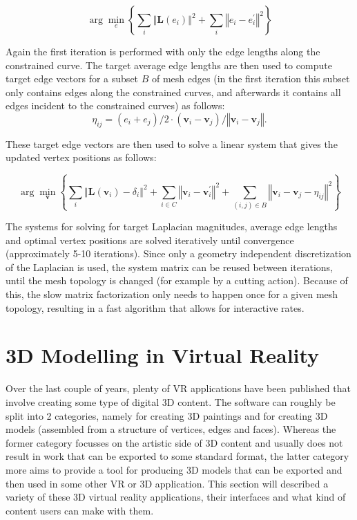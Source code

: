 \begin{equation}
\arg\min_{e} \left\lbrace \sum_{i} \left\Vert \mathbf{L}\left(e_{i}\right) \right\Vert^{2} + \sum_{i} \left\Vert e_{i} - e_{i}^{'} \right\Vert^{2} \right\rbrace
\end{equation}

Again the first iteration is performed with only the edge lengths along the constrained curve. 
The target average edge lengths are then used to compute target edge vectors for a subset $B$ of mesh edges (in the first iteration this subset only contains edges along the constrained curves, and afterwards it contains all edges incident to the constrained curves) as follows:
\begin{equation}
\eta_{ij} = \left( e_{i} + e_{j} \right) / 2 \cdot \left( \mathbf{v}_{i} - \mathbf{v}_{j} \right) / \left\Vert \mathbf{v}_{i} - \mathbf{v}_{j} \right\Vert.
\end{equation}

These target edge vectors are then used to solve a linear system that gives the updated vertex positions as follows: 

\begin{equation}
\arg\min_{\mathbf{v}} \left\lbrace \sum_{i} \left\Vert \mathbf{L}\left(\mathbf{v}_{i}\right) - \delta_{i} \right\Vert^{2} + \sum_{i \in C} \left\Vert \mathbf{v}_{i} - \mathbf{v}_{i}^{'} \right\Vert^{2} + \sum_{\left(i,j\right) \in B} \left \Vert \mathbf{v}_{i} - \mathbf{v}_{j} - \eta_{ij} \right\Vert^{2} \right\rbrace
\end{equation}

The systems for solving for target Laplacian magnitudes, average edge lengths and optimal vertex positions are solved iteratively until convergence (approximately 5-10 iterations). Since only a geometry independent discretization of the Laplacian is used, the system matrix can be reused between iterations, until the mesh topology is changed (for example by a cutting action). Because of this, the slow matrix factorization only needs to happen once for a given mesh topology, resulting in a fast algorithm that allows for interactive rates.	

\section{3D Modelling in Virtual Reality}
\label{sec:3dmodelling}
Over the last couple of years, plenty of VR applications have been published that involve creating some type of digital 3D content. The software can roughly be split into 2 categories, namely for creating 3D paintings and for creating 3D models (assembled from a structure of vertices, edges and faces). Whereas the former category focusses on the artistic side of 3D content and usually does not result in work that can be exported to some standard format, the latter category more aims to provide a tool for producing 3D models that can be exported and then used in some other VR or 3D application. 
This section will described a variety of these 3D virtual reality applications, their interfaces and what kind of content users can make with them. 

